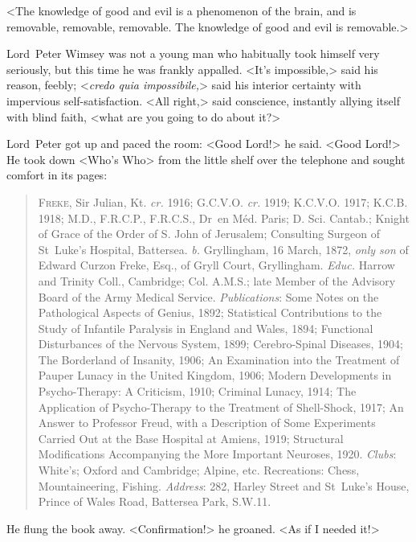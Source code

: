 <The knowledge of good and evil is a phenomenon of the brain, and is removable, removable, removable. The knowledge of good and evil is removable.>

Lord~Peter Wimsey was not a young man who habitually took himself very seriously, but this time he was frankly appalled. <It's impossible,> said his reason, feebly; <\textit{credo quia impossibile,}> said his interior certainty with impervious self-satisfaction. <All right,> said conscience, instantly allying itself with blind faith, <what are you going to do about it?>

Lord~Peter got up and paced the room: <Good Lord!> he said. <Good Lord!> He took down <Who's Who> from the little shelf over the telephone and sought comfort in its pages:

\begin{quote}
\textsc{Freke}, Sir Julian, Kt. \textit{cr.} 1916; G\@.C\@.V\@.O\@. \textit{cr.} 1919; K\@.C\@.V\@.O\@. 1917; K\@.C\@.B\@. 1918; M\@.D\@., F\@.R\@.C\@.P\@., F\@.R\@.C\@.S\@., Dr~en Méd. Paris; D\@. Sci. Cantab.; Knight of Grace of the Order of S\@. John of Jerusalem; Consulting Surgeon of St~Luke's Hospital, Battersea. \textit{b.} Gryllingham, 16 March, 1872, \textit{only son} of Edward Curzon Freke, Esq., of Gryll Court, Gryllingham. \textit{Educ.} Harrow and Trinity Coll., Cambridge; Col. A\@.M\@.S\@.; late Member of the Advisory Board of the Army Medical Service. \textit{Publications}: Some Notes on the Pathological Aspects of Genius, 1892; Statistical Contributions to the Study of Infantile Paralysis in England and Wales, 1894; Functional Disturbances of the Nervous System, 1899; Cerebro-Spinal Diseases, 1904; The Borderland of Insanity, 1906; An Examination into the Treatment of Pauper Lunacy in the United Kingdom, 1906; Modern Developments in Psycho-Therapy: A Criticism, 1910; Criminal Lunacy, 1914; The Application of Psycho-Therapy to the Treatment of Shell-Shock, 1917; An Answer to Professor Freud, with a Description of Some Experiments Carried Out at the Base Hospital at Amiens, 1919; Structural Modifications Accompanying the More Important Neuroses, 1920. \textit{Clubs}: White's; Oxford and Cambridge; Alpine, etc. Recreations: Chess, Mountaineering, Fishing. \textit{Address}: 282, Harley Street and St~Luke's House, Prince of Wales Road, Battersea Park, S\@.W\@.11.
\end{quote}

He flung the book away. <Confirmation!> he groaned. <As if I needed it!>

